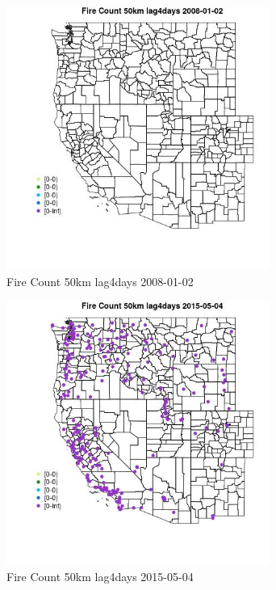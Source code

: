 \begin{figure} 
\centering  
\includegraphics[width=0.77\textwidth]{Code_Outputs/Report_ML_input_PM25_Step4_part_e_de_duplicated_aves_compiled_2019-05-18wNAs_MapObsFire_Count_50km_lag4days2008-01-02.jpg} 
\caption{\label{fig:Report_ML_input_PM25_Step4_part_e_de_duplicated_aves_compiled_2019-05-18wNAsMapObsFire_Count_50km_lag4days2008-01-02}Fire Count 50km lag4days 2008-01-02} 
\end{figure} 
 

\begin{figure} 
\centering  
\includegraphics[width=0.77\textwidth]{Code_Outputs/Report_ML_input_PM25_Step4_part_e_de_duplicated_aves_compiled_2019-05-18wNAs_MapObsFire_Count_50km_lag4days2015-05-04.jpg} 
\caption{\label{fig:Report_ML_input_PM25_Step4_part_e_de_duplicated_aves_compiled_2019-05-18wNAsMapObsFire_Count_50km_lag4days2015-05-04}Fire Count 50km lag4days 2015-05-04} 
\end{figure} 
 

